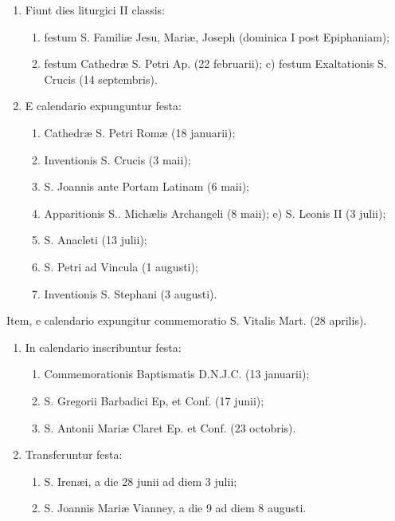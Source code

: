 \documentclass[vesperale_romanum.tex]{subfiles}
\begin{document}
\begin{enumerate}[nosep]
\item Fiunt dies liturgici II classis:
\begin{enumerate}[nosep,label=\alph*.]
\item festum S. Familiæ Jesu, Mariæ, Joseph (dominica I post Epiphaniam);
\item festum Cathedræ S. Petri Ap. (22 februarii); c) festum Exaltationis S. Crucis (14 septembris).
\end{enumerate}

\item E calendario expunguntur festa:
\begin{enumerate}[nosep,label=\alph*.]
\item Cathedræ S. Petri Romæ (18 januarii);
\item Inventionis S. Crucis (3 maii);
\item S. Joannis ante Portam Latinam (6 maii);
\item Apparitionis S.. Michælis Archangeli (8 maii); e) S. Leonis II (3 julii);
\item S. Anacleti (13 julii);
\item S. Petri ad Vincula (1 augusti);
\item Inventionis S. Stephani (3 augusti).
\end{enumerate}
\end{enumerate}

Item, e calendario expungitur commemoratio S. Vitalis Mart. (28 aprilis).

\begin{enumerate}

\item In calendario inscribuntur festa:
\begin{enumerate}[nosep,label=\alph*.]
\item Commemorationis Baptismatis D.N.J.C. (13 januarii);
\item S. Gregorii Barbadici Ep, et Conf. (17 junii);
\item S. Antonii Mariæ Claret Ep. et Conf. (23 octobris).
\end{enumerate}

\item Transferuntur festa:
\begin{enumerate}[nosep,label=\alph*.]
\item S. Irenæi, a die 28 junii ad diem 3 julii;
\item S. Joannis Mariæ Vianney, a die 9 ad diem 8 augusti.
\end{enumerate}
\end{enumerate}
\end{document}
